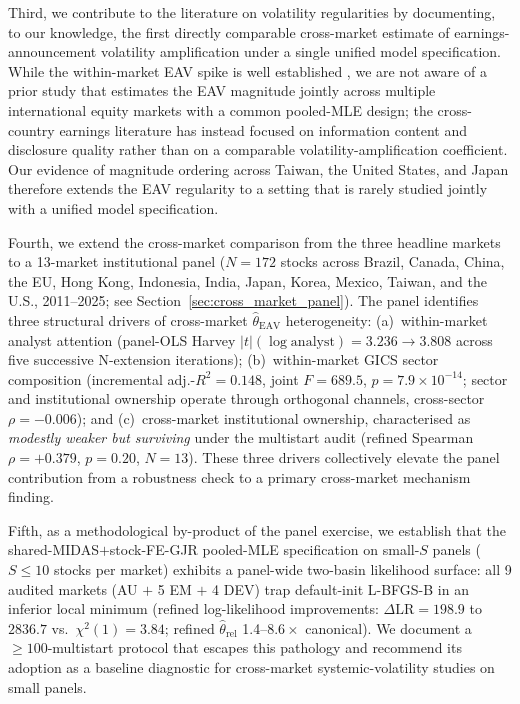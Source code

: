 \documentclass[12pt,a4paper]{article}
\begin{document}
Third, we contribute to the literature on volatility regularities by documenting,
to our knowledge, the first directly comparable cross-market estimate of
earnings-announcement volatility amplification under a single unified model
specification. While the within-market EAV spike is well established
\citep{beaver1968,patell1976,patell_wolfson1979,ball_kothari1991}, we are not
aware of a prior study that estimates the EAV magnitude jointly across multiple
international equity markets with a common pooled-MLE design; the cross-country
earnings literature has instead focused on information content and disclosure
quality rather than on a comparable volatility-amplification coefficient. Our
evidence of magnitude ordering across Taiwan, the United States, and Japan therefore
extends the EAV regularity to a setting that is rarely studied jointly with a
unified model specification.

Fourth, we extend the cross-market comparison from the three headline markets to
a 13-market institutional panel ($N = 172$ stocks across Brazil, Canada, China,
the EU, Hong Kong, Indonesia, India, Japan, Korea, Mexico, Taiwan, and the U.S.,
2011--2025; see Section~\ref{sec:cross_market_panel}). The panel identifies three
structural drivers of cross-market $\hat{\theta}_{\mathrm{EAV}}$ heterogeneity:
(a)~within-market analyst attention (panel-OLS Harvey $|t|(\log\mathrm{analyst}) =
3.236 \to 3.808$ across five successive N-extension iterations);
(b)~within-market GICS sector composition (incremental adj.-$R^2 = 0.148$, joint
$F = 689.5$, $p = 7.9 \times 10^{-14}$; sector and institutional ownership
operate through orthogonal channels, cross-sector $\rho = -0.006$); and
(c)~cross-market institutional ownership, characterised as \emph{modestly weaker
but surviving} under the multistart audit (refined Spearman $\rho = +0.379$,
$p = 0.20$, $N = 13$). These three drivers collectively elevate the panel
contribution from a robustness check to a primary cross-market mechanism finding.

Fifth, as a methodological by-product of the panel exercise, we establish that
the shared-MIDAS$+$stock-FE-GJR pooled-MLE specification on small-$S$ panels
($S \leq 10$ stocks per market) exhibits a panel-wide two-basin likelihood
surface: all 9 audited markets (AU $+$ 5 EM $+$ 4 DEV) trap default-init L-BFGS-B
in an inferior local minimum (refined log-likelihood improvements:
$\Delta\mathrm{LR} = 198.9$ to $2836.7$ vs.\ $\chi^2(1) = 3.84$; refined
$\hat{\theta}_{\mathrm{rel}}$ 1.4--$8.6\times$ canonical). We document a
$\geq 100$-multistart protocol that escapes this pathology and recommend its
adoption as a baseline diagnostic for cross-market systemic-volatility studies
on small panels.
\end{document}
